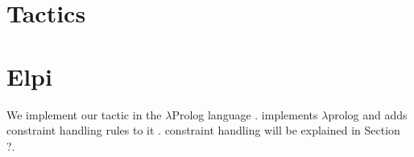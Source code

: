 \documentclass[thesis.tex]{subfiles}
\begin{document}
{\section{Tactics}

\section{Elpi}

We implement our tactic in the $\lambda$Prolog language \elpi \cite{dunchevELPIFastEmbeddable2015,guidiImplementingTypeTheory2019}. \elpi implements $\lambda$prolog \cite{millerHigherorderLogicProgramming1986,millerUniformProofsFoundation1991,belleanneePragmaticReconstructionLProlog1999,millerProgrammingHigherOrderLogic2012} and adds constraint handling rules to it \cite{monfroyConstraintHandlingRules2011}. constraint handling will be explained in Section ?.

}
\end{document}
